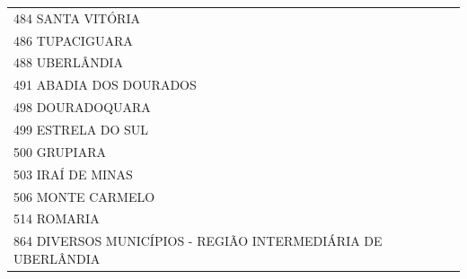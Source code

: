\documentclass{article}
\begin{document}
\begin{longtable}[c]{m{18cm}}
\multicolumn{1}{l}{ \hspace{2em} 484 SANTA VITÓRIA } \\
\multicolumn{1}{l}{ \hspace{2em} 486 TUPACIGUARA } \\
\multicolumn{1}{l}{ \hspace{2em} 488 UBERLÂNDIA } \\
\multicolumn{1}{l}{ \hspace{2em} 491 ABADIA DOS DOURADOS } \\
\multicolumn{1}{l}{ \hspace{2em} 498 DOURADOQUARA } \\
\multicolumn{1}{l}{ \hspace{2em} 499 ESTRELA DO SUL } \\
\multicolumn{1}{l}{ \hspace{2em} 500 GRUPIARA } \\
\multicolumn{1}{l}{ \hspace{2em} 503 IRAÍ DE MINAS } \\
\multicolumn{1}{l}{ \hspace{2em} 506 MONTE CARMELO } \\
\multicolumn{1}{l}{ \hspace{2em} 514 ROMARIA } \\
\multicolumn{1}{l}{ \hspace{2em} 864 DIVERSOS MUNICÍPIOS - REGIÃO INTERMEDIÁRIA DE UBERLÂNDIA } \\
\end{longtable}
\newpage
\end{document}
